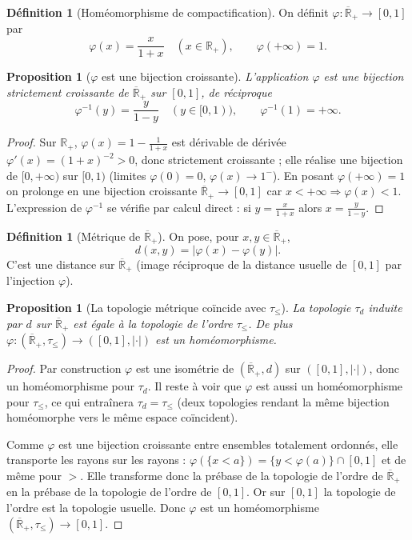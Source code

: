 \documentclass[11pt,a4paper]{article}
\theoremstyle{plain}
\newtheorem{proposition}[theorem]{Proposition}
\theoremstyle{definition}
\newtheorem{definition}[theorem]{Définition}
\newcommand{\Rp}{\mathbb{R}_+}
\newcommand{\Rpb}{\overline{\mathbb{R}}_+}
\begin{document}
\begin{definition}[Homéomorphisme de compactification]\label{def:phi}
On définit $\varphi:\Rpb\to[0,1]$ par
\[
\varphi(x)=\frac{x}{1+x}\quad(x\in\Rp),\qquad \varphi(+\infty)=1.
\]
\end{definition}

\begin{proposition}[$\varphi$ est une bijection croissante]\label{prop:phi-bij}
L'application $\varphi$ est une bijection strictement croissante de $\Rpb$ sur
$[0,1]$, de réciproque
\[
\varphi^{-1}(y)=\frac{y}{1-y}\quad(y\in[0,1)),\qquad \varphi^{-1}(1)=+\infty.
\]
\end{proposition}

\begin{proof}
Sur $\Rp$, $\varphi(x)=1-\frac{1}{1+x}$ est dérivable de dérivée
$\varphi'(x)=(1+x)^{-2}>0$, donc strictement croissante ; elle réalise une
bijection de $[0,+\infty)$ sur $[0,1)$ (limites $\varphi(0)=0$,
$\varphi(x)\to1^-$). En posant $\varphi(+\infty)=1$ on prolonge en une
bijection croissante $\Rpb\to[0,1]$ car $x<+\infty\Rightarrow\varphi(x)<1$.
L'expression de $\varphi^{-1}$ se vérifie par calcul direct : si
$y=\frac{x}{1+x}$ alors $x=\frac{y}{1-y}$.
\end{proof}

\begin{definition}[Métrique de $\Rpb$]\label{def:metrique}
On pose, pour $x,y\in\Rpb$,
\[
d(x,y)=\big|\varphi(x)-\varphi(y)\big|.
\]
C'est une distance sur $\Rpb$ (image réciproque de la distance usuelle de
$[0,1]$ par l'injection $\varphi$).
\end{definition}

\begin{proposition}[La topologie métrique coïncide avec $\tau_\le$]\label{prop:coinc-metrique}
La topologie $\tau_d$ induite par $d$ sur $\Rpb$ est égale à la topologie de
l'ordre $\tau_\le$. De plus $\varphi:(\Rpb,\tau_\le)\to([0,1],|\cdot|)$ est un
homéomorphisme.
\end{proposition}

\begin{proof}
Par construction $\varphi$ est une isométrie de $(\Rpb,d)$ sur
$([0,1],|\cdot|)$, donc un homéomorphisme pour $\tau_d$. Il reste à voir que
$\varphi$ est aussi un homéomorphisme pour $\tau_\le$, ce qui entraînera
$\tau_d=\tau_\le$ (deux topologies rendant la même bijection homéomorphe vers
le même espace coïncident).

Comme $\varphi$ est une bijection croissante entre ensembles totalement
ordonnés, elle transporte les rayons sur les rayons :
$\varphi(\{x<a\})=\{y<\varphi(a)\}\cap[0,1]$ et de même pour $>$. Elle
transforme donc la prébase de la topologie de l'ordre de $\Rpb$ en la prébase
de la topologie de l'ordre de $[0,1]$. Or sur $[0,1]$ la topologie de l'ordre
est la topologie usuelle. Donc $\varphi$ est un homéomorphisme
$(\Rpb,\tau_\le)\to[0,1]$.
\end{proof}
\end{document}
